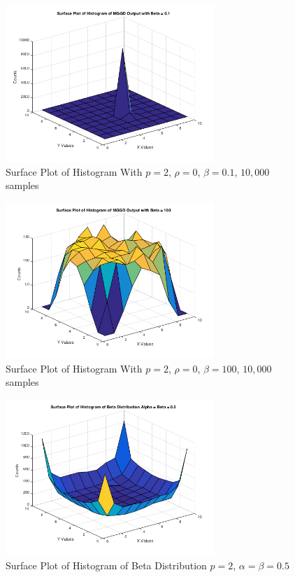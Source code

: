 \documentclass[journal]{IEEEtran}
\begin{document}
\begin{figure}[h]
\centering
\includegraphics[width=3.1in]{../images/hist_b_01.png}
\caption{Surface Plot of Histogram With \(p = 2\), \(\rho = 0\), \(\beta = 0.1\), \(10,000\) samples}
\label{fig:hist_b_01}
\end{figure}

\begin{figure}[h]
\centering
\includegraphics[width=3.1in]{../images/hist_b_100.png}
\caption{Surface Plot of Histogram With \(p = 2\), \(\rho = 0\), \(\beta = 100\), \(10,000\) samples}
\label{fig:hist_b_100}
\end{figure}

\begin{figure}[h]
\centering
\includegraphics[width=3.1in]{../images/hist_beta_05_05.png}
\caption{Surface Plot of Histogram of Beta Distribution \(p = 2\), \(\alpha = \beta = 0.5\)}
\label{fig:beta_dist}
\end{figure}
\end{document}
